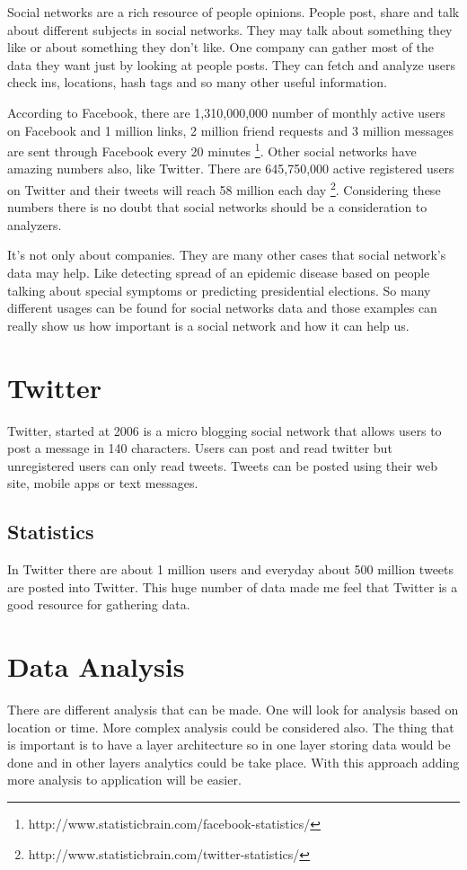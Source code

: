 \documentclass[a4paper,11pt]{report}
\begin{document}
Social networks are a rich resource of people opinions. People post, share and talk about different subjects in social networks. They may talk about something they like or about something they don't like. One company can gather most of the data they want just by looking at people posts. They can fetch and analyze users check ins, locations, hash tags and so many other useful information.

According to Facebook, there are 1,310,000,000 number of monthly active users on Facebook and 1 million links, 2 million friend requests and 3 million messages are sent through Facebook every 20 minutes
\footnote{http://www.statisticbrain.com/facebook-statistics/}.
Other social networks have amazing numbers also, like Twitter. There are  	645,750,000 active registered users on Twitter and their tweets will reach 58 million each day
\footnote{http://www.statisticbrain.com/twitter-statistics/}.
Considering these numbers there is no doubt that social networks should be a consideration to analyzers.

It's not only about companies. They are many other cases that social network's data may help. Like detecting spread of an epidemic disease based on people talking about special symptoms or predicting presidential elections. So many different usages can be found for social networks data and those examples can really show us how important is a social network and how it can help us.

\section{Twitter}
Twitter, started at 2006 is a micro blogging social network that allows users to post a message in 140 characters. Users can post and read twitter but unregistered users can only read tweets. Tweets can be posted using their web site, mobile apps or text messages.
\subsection{Statistics}
In Twitter there are about 1 million users and everyday about 500 million tweets are posted into Twitter. This huge number of data made me feel that Twitter is a good resource for gathering data.

\section{Data Analysis}
There are different analysis that can be made. One will look for analysis based on location or time. More complex analysis could be considered also. The thing that is important is to have a layer architecture so in one layer storing data would be done and in other layers analytics could be take place. With this approach adding more analysis to application will be easier.
\end{document}
